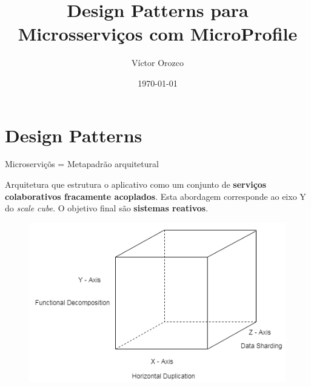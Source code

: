 \documentclass[aspectratio=169]{beamer}
\title{Design Patterns para Microsserviços com MicroProfile}
\author{Víctor Orozco}
\institute{Nabenik}
\date{\today}
\begin{document}
{
    \frame{\titlepage}
}


{
    \section{Design Patterns}
}

\begin{frame}{Microserviçõs = Metapadrão arquitetural}


Arquitetura que estrutura o aplicativo como um conjunto de \textbf{serviços colaborativos fracamente acoplados}. Esta abordagem corresponde ao eixo Y do \textit{scale cube}. O objetivo final são \textbf{sistemas reativos}.

\begin{figure}
	\centering
	\includegraphics[width=0.7\linewidth]{Images/scale}
\end{figure}

\end{frame}
\end{document}
